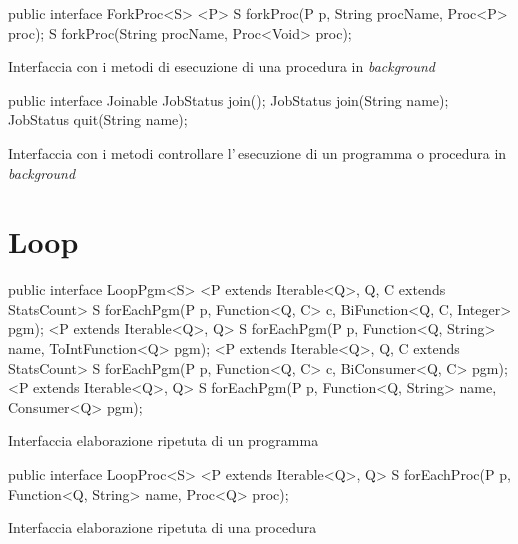 \begin{elisting}[!htb]
\begin{javacode}
public interface ForkProc<S> {
    <P> S forkProc(P p, String procName, Proc<P> proc);
    S forkProc(String procName, Proc<Void> proc);
}
\end{javacode}
\caption{Interfaccia con i metodi di esecuzione di una procedura in \textit{background}}
\label{lst:forkProc}
\end{elisting}

\begin{elisting}[!htb]
\begin{javacode}
public interface Joinable {
    JobStatus join();
    JobStatus join(String name);
    JobStatus quit(String name);
}
\end{javacode}
\caption{Interfaccia con i metodi controllare l'\,esecuzione di un programma o procedura in \textit{background}}
\label{lst:joinAware}
\end{elisting}


\section{Loop} \label{sec:loop}


\begin{elisting}[!htb]
\begin{javacode}
public interface LoopPgm<S> {
    <P extends Iterable<Q>, Q, C extends StatsCount> S forEachPgm(P p, Function<Q, C> c,
                                                                  BiFunction<Q, C, Integer> pgm);
    <P extends Iterable<Q>, Q> S forEachPgm(P p, Function<Q, String> name, ToIntFunction<Q> pgm);
    <P extends Iterable<Q>, Q, C extends StatsCount> S forEachPgm(P p, Function<Q, C> c, BiConsumer<Q, C> pgm);
    <P extends Iterable<Q>, Q> S forEachPgm(P p, Function<Q, String> name, Consumer<Q> pgm);
}
\end{javacode}
\caption{Interfaccia elaborazione ripetuta di un programma}
\label{lst:loopPgm}
\end{elisting}

\begin{elisting}[!htb]
\begin{javacode}
public interface LoopProc<S> {
    <P extends Iterable<Q>, Q> S forEachProc(P p, Function<Q, String> name, Proc<Q> proc);
}
\end{javacode}
\caption{Interfaccia elaborazione ripetuta di una procedura}
\label{lst:loopProc}
\end{elisting}
